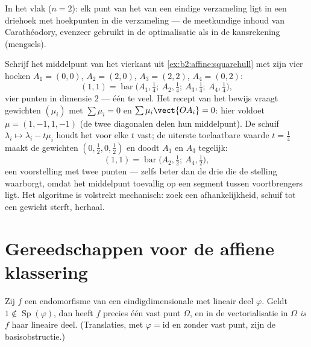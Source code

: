 \begin{example}
In het vlak ($n = 2$): elk punt van het  van een
eindige verzameling ligt in een driehoek met hoekpunten in die
verzameling --- de meetkundige inhoud van Carathéodory, evenzeer
gebruikt in de optimalisatie als in de kansrekening (mengsels).
\end{example}

\begin{example}\label{ex:b2:affine:caratheodoryrun}
Schrijf het middelpunt van het vierkant uit
\cref{ex:b2:affine:squarehull} met zijn vier hoeken $A_1 = (0,0)$,
$A_2 = (2,0)$, $A_3 = (2,2)$, $A_4 = (0,2)$:
\[
(1,1) = \operatorname{bar}\bigl(A_1, \tfrac14;\ A_2,
\tfrac14;\ A_3, \tfrac14;\ A_4, \tfrac14\bigr),
\]
vier punten in dimensie $2$ --- één te veel. Het recept van het
bewijs vraagt gewichten $(\mu_i)$ met $\sum\mu_i = 0$ en
$\sum\mu_i\vect{OA_i} = 0$: hier voldoet $\mu = (1, -1, 1, -1)$ (de
twee diagonalen delen hun middelpunt). De schuif $\lambda_i \mapsto
\lambda_i - t\mu_i$ houdt het  voor elke $t$ vast; de
uiterste toelaatbare waarde $t = \frac14$ maakt de gewichten $(0,
\tfrac12, 0, \tfrac12)$ en doodt $A_1$ en $A_3$ tegelijk:
\[
(1,1) = \operatorname{bar}\bigl(A_2, \tfrac12;\ A_4,
\tfrac12\bigr),
\]
een voorstelling met twee punten --- zelfs beter dan de drie die de
stelling waarborgt, omdat het middelpunt toevallig op een segment
tussen voortbrengers ligt. Het algoritme is volstrekt mechanisch:
zoek een afhankelijkheid, schuif tot een gewicht sterft, herhaal.
\end{example}

\section{Gereedschappen voor de affiene klassering}

\begin{proposition}\label{prop:b2:affine:fixedpoint}
Zij $f$ een  endomorfisme van een eindigdimensionale  met lineair deel $\varphi$. Geldt $1 \notin
\operatorname{Sp}(\varphi)$, dan heeft $f$ precies één vast punt
$\Omega$, en in de vectorialisatie in $\Omega$ \emph{is} $f$ haar
lineaire deel. (Translaties, met $\varphi = \mathrm{id}$ en zonder
vast punt, zijn de basisobstructie.)
\end{proposition}

